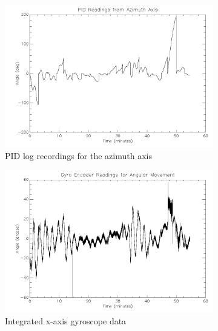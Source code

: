 {\begin{figure}[htbp]
\captionsetup[subfigure]{justification=centering}
\captionsetup{justification=centering}
    \centering
		\begin{subfigure}{0.45\textwidth}
		\includegraphics[width=1\linewidth]{appendix/img/campaign_results/pid_az.png}
		\caption{PID log recordings for the azimuth axis}
		\label{fig:sub:pidazvs}
	\end{subfigure}
	\begin{subfigure}{0.45\textwidth}
		\includegraphics[width=1\linewidth]{appendix/img/campaign_results/gyroint.png}
		\caption{Integrated x-axis gyroscope data}
		\label{fig:sub:gyrointx}
	\end{subfigure}
	\begin{subfigure}{0.45\textwidth}

\end{subfigure}
\end{figure}}
